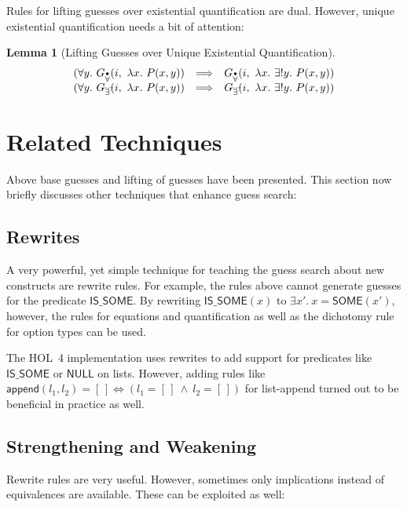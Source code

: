 \documentclass[a4paper,12pt,DIV=12,oneside]{scrbook}
\newtheorem{lemma}{Lemma}[section]
\theoremstyle{definition}
\theoremstyle{remark}
\newcommand{\GEG}{\ensuremath{G_{\accentset{\_\,\_}{\exists}}}}
\newcommand{\GUP}{\ensuremath{G_{\accentset{\bullet}{\forall}}}}
\begin{document}
Rules for lifting guesses over existential quantification are dual. However, unique existential quantification needs a bit
of attention:

\begin{lemma}[Lifting Guesses over Unique Existential Quantification]
\[
\begin{array}{c@{\quad}c@{\quad}l}
(\forall y.\ \GUP(i,\ \lambda x.\ P(x, y)) & \Longrightarrow & \GUP(i,\ \lambda x.\ \exists! y.\ P(x, y)) \\
(\forall y.\ \GEG(i,\ \lambda x.\ P(x, y)) & \Longrightarrow & \GEG(i,\ \lambda x.\ \exists! y.\ P(x, y)) 
\end{array}
\]
\end{lemma}


\section{Related Techniques}\label{sec_other_techniques}

Above base guesses and lifting of guesses have been presented. This section now
briefly discusses other techniques that enhance guess search: 

\subsection{Rewrites}\label{subsec_other_techniques_rewrites}

A very powerful, yet simple technique for teaching the guess search
about new constructs are rewrite rules. For example, the rules above
cannot generate guesses for the predicate $\textsf{IS\_SOME}$. By
rewriting $\textsf{IS\_SOME}(x)$ to $\exists x'.\ x =
\textsf{SOME}(x')$, however, the rules for equations and
quantification as well as the dichotomy rule for option types can be
used.

The HOL~4 implementation uses rewrites to add support for predicates
like $\textsf{IS\_SOME}$ or $\textsf{NULL}$ on lists. However, adding
rules like $\textsf{append}(l_1, l_2) = [\,] \Longleftrightarrow (l_1 =
[\,]\ \wedge\ l_2 = [\,])$ for list-append turned out to be beneficial
in practice as well.

\subsection{Strengthening and Weakening}\label{subsec_other_techniques_imp}

Rewrite rules are very useful. However, sometimes only implications instead of
equivalences are available. These can be exploited as well:
\end{document}
